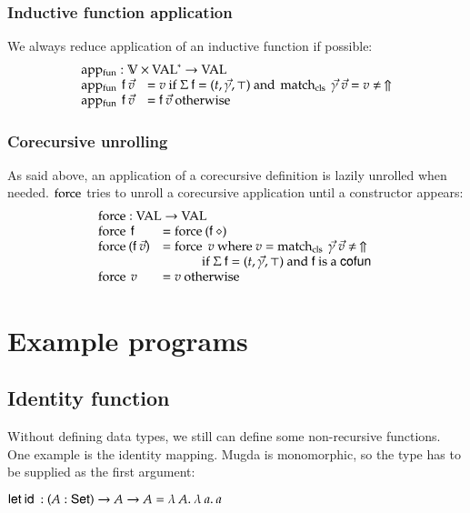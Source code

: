 \subsubsection{Inductive function application}
We always reduce application of an inductive function if possible:\[
\begin{array}{ll}
\multicolumn{2}{l}{\apf : \cV \times \ves{\Val} \ra \Val}\\
\apf \: \ff \: \vec{v} & = v \mbox{ if } \Sig \: \ff = (t,\vec{\gamma},\top) \mbox { and } \matchcls \: \vec{\gamma} \: \vec{v} = v \neq \: \stuck \\ 
\apf \: \ff \: \vec{v} & = \ff \: \vec{v} \mbox { otherwise } 
\end{array}
\]

\subsubsection{Corecursive unrolling}
As said above, an application of a corecursive definition is lazily unrolled when needed.
$\operatorname{force}$ tries to unroll a corecursive application until a constructor appears:
\[
\begin{array}{ll}
\multicolumn{2}{l}{\forc : \Val \ra \Val }\\
\forc \: \ff & = \forc \: (\ff \: \diamond) \\
\forc \: (\ff \: \vec{v}) & = \forc \; v \mbox{ where } v = \matchcls \: \vec{\gamma} \: \vec{v} \neq \: \stuck\\
& \spcx \mbox{ if } \Sig \: \ff = (t,\vec{\gamma},\top) \mbox { and } \ff \mbox { is a } \cofun\\ 
\forc \: v & = v \mbox{ otherwise}
\end{array}
\]

\section{Example programs}

\subsection{Identity function}
Without defining data types, we still can define some non-recursive functions.
One example is the identity mapping. 
Mugda is monomorphic, so the type has to be supplied as the first argument:
\begin{bsp}
$\mathsf{let}\: \mathsf{id}\: : ( A : \mathsf{Set} ) \rightarrow{A \rightarrow A} = \lambda\: A .\:\lambda\: a .\:a$   
\end{bsp}

